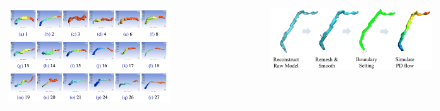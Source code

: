 \documentclass{beamer}
\begin{document}
\begin{frame}


    \begin{columns}
        \begin{column}{0.55\textwidth}
            \begin{figure}[H]
                \centering
                \includegraphics[width=\textwidth]{figures/Result_CFX.jpg}
            \end{figure}


        \end{column}


        \begin{column}{0.45\textwidth}
            \begin{figure}[H]
                \centering
                \includegraphics[width=1.1\textwidth]{figures/Process-CFX.jpg}
            \end{figure}



        \end{column}
        
    \end{columns}
    

\end{frame}
\end{document}
